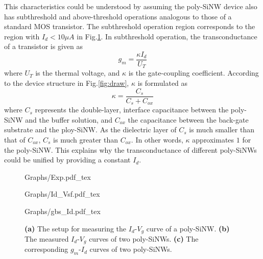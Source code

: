 \documentclass{article}
\begin{document}
This characteristics could be understood by assuming the poly-SiNW device also
has subthreshold and above-threshold operations analogous to those of a standard MOS transistor.
The subthreshold operation region corresponds to the region with $I_d < 10\mu A$ in Fig.\ref{fig:idvg}.
In subthreshold operation, the transconductance of a transistor is given as
%
\begin{equation}
  g_m = \frac{\kappa I_{d}}{U_T}
\end{equation}
%
where $U_T$ is the thermal voltage, and
$\kappa$ is the gate-coupling coefficient.
According to the device structure in Fig.\ref{fig:draw},
$\kappa$ is formulated as
%
\begin{equation}
  \kappa=\frac{C_s}{C_s+C_{ox}}
\end{equation}
%
where $C_s$ represents the double-layer, interface capacitance between the poly-SiNW and the buffer solution,
and $C_{ox}$ the capacitance between the back-gate substrate and the ploy-SiNW.
As the dielectric layer of $C_s$ is much smaller than that of $C_{ox}$,
$C_s$ is much greater than $C_{ox}$. In other words, $\kappa$  approximates $1$ for the poly-SiNW.
This explains why the transconductance of different poly-SiNWs could be unified by providing a constant $I_d$.
%
\begin{figure}
    \begin{minipage}[!htb]{0.4\linewidth}
        \centering
        \def\svgwidth{3cm}
        \fontsize{6}{15}\selectfont
         {Graphs/Exp.pdf_tex}
        \fontsize{10}{10}\selectfont
    \end{minipage}
    \begin{minipage}[!htb]{0.6\linewidth}
        \begin{minipage}[!htb]{0.97\linewidth}
            \centering
            \def\svgwidth{4.3cm}
            \fontsize{6}{15}\selectfont
             {Graphs/Id_Vsf.pdf_tex}
        \end{minipage}
        \vfill
        \begin{minipage}[!htb]{1\linewidth}
            \centering
            \def\svgwidth{3.8cm}
            \fontsize{6}{15}\selectfont
             {Graphs/gbs_Id.pdf_tex}
        \end{minipage}
    \end{minipage}
    \caption{\textbf{(a)} The setup for measuring the $I_d$-$V_g$ curve of a poly-SiNW.
    \textbf{(b)} The measured $I_{d}$-$V_{g}$ curves of two poly-SiNWs.
    \textbf{(c)} The corresponding $g_m$-$I_{d}$ curves of two poly-SiNWs.}
    \label{fig:idvg}
\end{figure}
%
\end{document}
